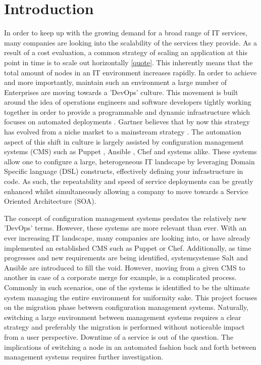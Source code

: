 \section{Introduction}\label{sec:introduction}
In order to keep up with the growing demand for a broad range of IT services, many companies are looking into the scalability of the services they provide. As a result of a cost evaluation, a common strategy of scaling an application at this point in time is to scale out horizontally \ref{quote}\cite{jaapvginkel}. This inherently means that the total amount of nodes in an IT environment increases rapidly. In order to achieve and more importantly, maintain such an environment a large number of Enterprises are moving towards a 'DevOps' culture. This movement is built around the idea of operations engineers and software developers tightly working together in order to provide a programmable and dynamic infrastructure which focuses on automated deployments \cite{loukides_2012}. Gartner believes that by now this strategy has evolved from a niche market to a mainstream strategy \cite{gartner_2015}. The automation aspect of this shift in culture is largely assisted by configuration management systems (CMS) such as Puppet \cite{whatispuppet}, Ansible \cite{whatisansible}, Chef \cite{whatischef} and systems alike. These systems allow one to configure a large, heterogeneous IT landscape by leveraging Domain Specific language (DSL) constructs, effectively defining your infrastructure in code. As such, the repeatability and speed of service deployments can be greatly enhanced whilst simultaneously allowing a company to move towards a Service Oriented Architecture (SOA).

The concept of configuration management systems predates the relatively new 'DevOps' terms. However, these systems are more relevant than ever. With an ever increasing IT landscape, many companies are looking into, or have already implemented an established CMS such as Puppet or Chef. Additionally, as time progresses and new requirements are being identified, systemsystemse Salt and Ansible are introduced to fill the void. However, moving from a given CMS to another in case of a corporate merge for example, is a complicated process. Commonly in such scenarios, one of the systems is identified to be the ultimate system managing the entire environment for uniformity sake. This project focuses on the migration phase between configuration management systems. Naturally, switching a large environment between management systems requires a clear strategy and preferably the migration is performed without noticeable impact from a user perspective. Downtime of a service is out of the question. The implications of switching a node in an automated fashion back and forth between management systems requires further investigation. 

